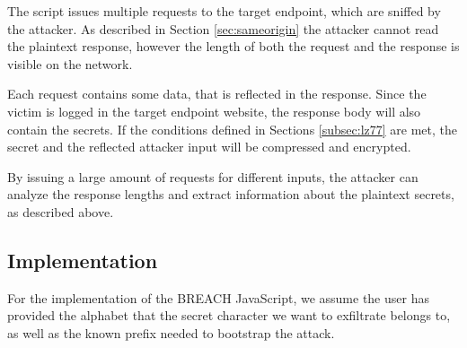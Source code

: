 The script issues multiple requests to the target endpoint, which are sniffed by
the attacker. As described in Section \ref{sec:sameorigin} the attacker cannot
read the plaintext response, however the length of both the request and the
response is visible on the network.

Each request contains some data, that is reflected in the response. Since the
victim is logged in the target endpoint website, the response body will also
contain the secrets. If the conditions defined in Sections \ref{subsec:lz77} are
met, the secret and the reflected attacker input will be compressed and
encrypted.

By issuing a large amount of requests for different inputs, the attacker can
analyze the response lengths and extract information about the plaintext
secrets, as described above.

\subsection{Implementation}

For the implementation of the BREACH JavaScript, we assume the user has provided
the alphabet that the secret character we want to exfiltrate belongs to, as well
as the known prefix needed to bootstrap the attack.
